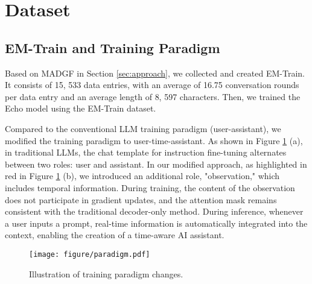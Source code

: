 \section{Dataset}

\subsection{EM-Train and Training Paradigm}
Based on MADGF in Section \ref{sec:approach}, we collected and created EM-Train. It consists of 15, 533 data entries, with an average of 16.75 conversation rounds per data entry and an average length of 8, 597 characters. Then, we trained the Echo model using the EM-Train dataset.

Compared to the conventional LLM training paradigm (user-assistant), we modified the training paradigm to user-time-assistant. As shown in Figure \ref{fig:paradigm} (a), in traditional LLMs, the chat template for instruction fine-tuning alternates between two roles: user and assistant. In our modified approach, as highlighted in red in Figure \ref{fig:paradigm} (b), we introduced an additional role, "observation," which includes temporal information. During training, the content of the observation does not participate in gradient updates, and the attention mask remains consistent with the traditional decoder-only method. During inference, whenever a user inputs a prompt, real-time information is automatically integrated into the context, enabling the creation of a time-aware AI assistant.

% 



\begin{figure}[h]
\centering

\texttt{[image: figure/paradigm.pdf]} \\

\caption{Illustration of training paradigm changes.}
\label{fig:paradigm}
\vspace{-1mm}
\end{figure}

